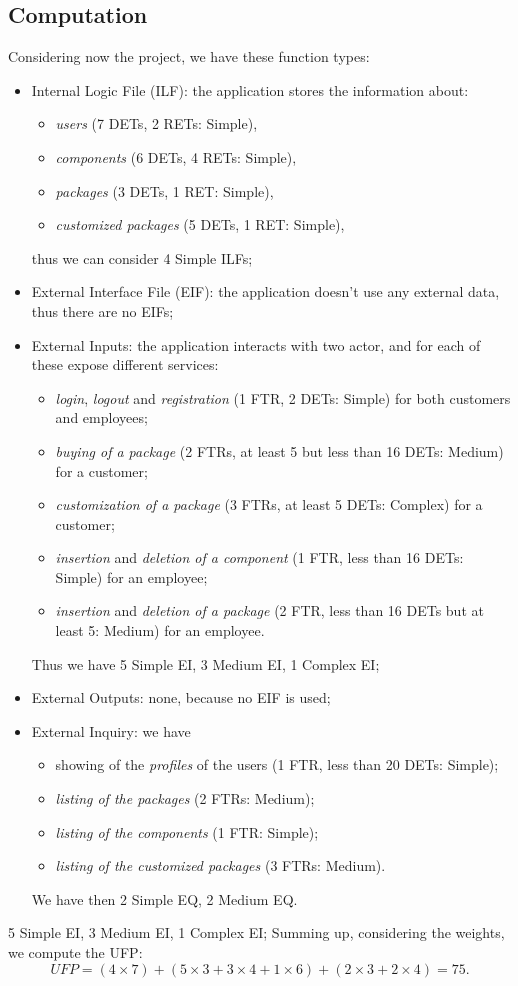 \documentclass[a4paper,12pt]{book}
\begin{document}
\subsection{Computation}
Considering now the project, we have these function types:
\begin{itemize}
  \item Internal Logic File (ILF): the application stores the information about:
  \begin{itemize}
    \item \textit{users} (7 DETs, 2 RETs: Simple),
    \item \textit{components} (6 DETs, 4 RETs: Simple),
    \item \textit{packages} (3 DETs, 1 RET: Simple),
    \item \textit{customized packages} (5 DETs, 1 RET: Simple),
  \end{itemize}
  thus we can consider 4 Simple ILFs;
  \item External Interface File (EIF): the application doesn't use any external data, thus there are no EIFs;
  \item External Inputs: the application interacts with two actor, and for each of these expose different services:
  \begin{itemize}
    \item \textit{login}, \textit{logout} and \textit{registration} (1 FTR, 2 DETs: Simple) for both customers and employees;
    \item \textit{buying of a package} (2 FTRs, at least 5 but less than 16 DETs: Medium) for a customer;
    \item \textit{customization of a package} (3 FTRs, at least 5 DETs: Complex) for a customer;
    \item \textit{insertion} and \textit{deletion of a component} (1 FTR, less than 16 DETs: Simple) for an employee;
    \item \textit{insertion} and \textit{deletion of a package} (2 FTR, less than 16 DETs but at least 5: Medium) for an employee.
  \end{itemize}
  
  Thus we have 5 Simple EI, 3 Medium EI, 1 Complex EI;
  \item External Outputs: none, because no EIF is used;
  \item External Inquiry: we have
  \begin{itemize}
    \item showing of the \textit{profiles} of the users (1 FTR, less than 20 DETs: Simple);
    \item \textit{listing of the packages} (2 FTRs: Medium);
    \item \textit{listing of the components} (1 FTR: Simple);
    \item \textit{listing of the customized packages} (3 FTRs: Medium).
  \end{itemize}
  
  We have then 2 Simple EQ, 2 Medium EQ.
\end{itemize}
5 Simple EI, 3 Medium EI, 1 Complex EI;
Summing up, considering the weights, we compute the UFP:
\[
  UFP = (4 \times 7) + (5 \times 3 + 3 \times 4 + 1 \times 6) + (2 \times 3 + 2 \times 4) = 75.
\]
\end{document}
